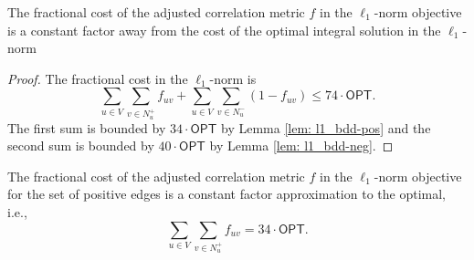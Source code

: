 \begin{lemma}
    The fractional cost of the adjusted correlation metric $f$ in the $\ell_1$-norm objective is a constant factor away from the cost of the optimal integral solution in the $\ell_1$-norm
\end{lemma}
\begin{proof}
The fractional cost in the $\ell_1$-norm is
     $$\sum_{u \in V} \sum_{v \in N_u^+} f_{uv} + \sum_{u \in V} \sum_{v \in N_u^-} (1-f_{uv}) \leq 74 \cdot \textsf{OPT}.$$
The first sum is bounded by $34\cdot \textsf{OPT}$ by Lemma \ref{lem: l1_bdd-pos} and the second sum is bounded by $40\cdot \textsf{OPT}$ by Lemma \ref{lem: l1_bdd-neg}. 
\end{proof}



\begin{lemma} \label{lem: l1_bdd-pos}
    The fractional cost of the adjusted correlation metric $f$ in the $\ell_1$-norm objective for the set of positive edges is a constant factor approximation to the optimal, i.e.,
    $$ \sum_{u \in V} \sum_{v \in N_u^+} f_{uv} = 34 \cdot \textsf{OPT}.$$
\end{lemma}

